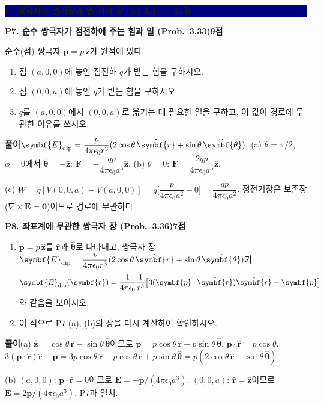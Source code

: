 \documentclass[10pt,a4paper]{article}
\newcommand{\vect}[1]{\symbf{#1}}
\newcommand{\unit}[1]{\hat{\symbf{#1}}}
\newcommand{\problem}[3]{%
  \needspace{0.18\textheight}
  \par\vspace{2.2mm}
  {\large\bfseries\color{navy}#1\hfill{\normalsize\color{blue}#2점}}\par
  \smallskip #3\par
}
\newcommand{\sectionbar}[1]{%
  \needspace{0.25\textheight}
  \par\vspace{2.5mm}
  \colorbox{navy}{\parbox{0.965\linewidth}{\color{white}\bfseries\large #1}}
  \par\vspace{0.5mm}
}
\newcommand{\answer}[1]{\par\begin{tcolorbox}[colback=white,colframe=hair,boxrule=0.5pt,arc=0pt,left=3mm,right=3mm,top=1.5mm,bottom=1.5mm]{\color{blue}\bfseries 풀이}\quad #1\end{tcolorbox}}
\begin{document}
\sectionbar{C. 쌍극자의 전기장과 먼 거리 장 (§3.4.4) · 34점}
\problem{P7. 순수 쌍극자가 점전하에 주는 힘과 일 (Prob.~3.33)}{9}{%

순수(점) 쌍극자 $\vect p=p\,\unit z$가 원점에 있다.
\begin{enumerate}[label=(\alph*)]
  \item 점 $(a,0,0)$에 놓인 점전하 $q$가 받는 힘을 구하시오.
  \item 점 $(0,0,a)$에 놓인 $q$가 받는 힘을 구하시오.
  \item $q$를 $(a,0,0)$에서 $(0,0,a)$로 옮기는 데 필요한 일을 구하고, 이 값이 경로에 무관한 이유를 쓰시오.
\end{enumerate}
\answer{$\vect E_{\rm dip}=\dfrac{p}{4\pi\epsilon_0r^3}(2\cos\theta\,\unit r+\sin\theta\,\unit\theta)$.
(a) $\theta=\pi/2$, $\phi=0$에서 $\unit\theta=-\unit z$: $\boxed{\vect F=-\dfrac{qp}{4\pi\epsilon_0a^3}\unit z}$.\quad
(b) $\theta=0$: $\boxed{\vect F=\dfrac{2qp}{4\pi\epsilon_0a^3}\unit z}$.

(c) $W=q[V(0,0,a)-V(a,0,0)]=q\Big[\dfrac{p}{4\pi\epsilon_0a^2}-0\Big]=\boxed{\dfrac{qp}{4\pi\epsilon_0a^2}}$. 정전기장은 보존장($\nabla\times\vect E=\vect 0$)이므로 경로에 무관하다.}}
\problem{P8. 좌표계에 무관한 쌍극자 장 (Prob.~3.36)}{7}{%

\begin{enumerate}[label=(\alph*)]
  \item $\vect p=p\,\unit z$를 $\unit r$과 $\unit\theta$로 나타내고, 쌍극자 장 $\vect E_{\rm dip}=\dfrac{p}{4\pi\epsilon_0r^3}(2\cos\theta\,\unit r+\sin\theta\,\unit\theta)$가
  \[
  \vect E_{\rm dip}(\vect r)=\frac{1}{4\pi\epsilon_0}\frac{1}{r^3}\big[3(\vect p\cdot\unit r)\unit r-\vect p\big]
  \]
  와 같음을 보이시오.
  \item 이 식으로 P7 (a), (b)의 장을 다시 계산하여 확인하시오.
\end{enumerate}
\answer{(a) $\unit z=\cos\theta\,\unit r-\sin\theta\,\unit\theta$이므로 $\vect p=p\cos\theta\,\unit r-p\sin\theta\,\unit\theta$, $\vect p\cdot\unit r=p\cos\theta$.
$3(\vect p\cdot\unit r)\unit r-\vect p=3p\cos\theta\,\unit r-p\cos\theta\,\unit r+p\sin\theta\,\unit\theta=p(2\cos\theta\,\unit r+\sin\theta\,\unit\theta)$.

(b) $(a,0,0)$: $\vect p\cdot\unit r=0$이므로 $\vect E=-\vect p/(4\pi\epsilon_0a^3)$. \quad $(0,0,a)$: $\unit r=\unit z$이므로 $\vect E=2\vect p/(4\pi\epsilon_0a^3)$. P7과 일치.}}
\end{document}
